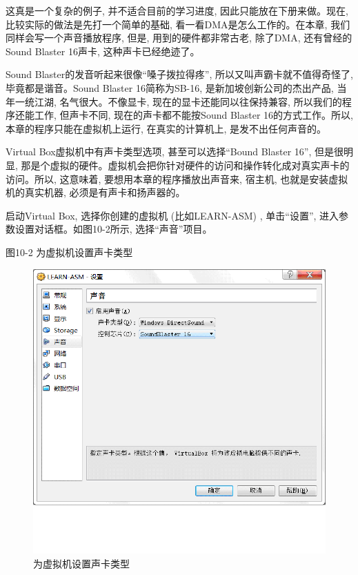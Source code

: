 \documentclass[12pt]{article}
\begin{document}
\begin{CJK}{UTF8}{gbsn}
这真是一个复杂的例子, 并不适合目前的学习进度, 因此只能放在下册来做。现在, 比较实际的做法是先打一个简单的基础, 看一看DMA是怎么工作的。在本章, 我们同样会写一个声音播放程序, 但是, 用到的硬件都非常古老, 除了DMA, 还有曾经的Sound Blaster 16声卡, 这种声卡已经绝迹了。

Sound Blaster的发音听起来很像“嗓子拨拉得疼”, 所以又叫声霸卡就不值得奇怪了, 毕竟都是谐音。Sound Blaster 16简称为SB-16, 是新加坡创新公司的杰出产品, 当年一统江湖, 名气很大。不像显卡, 现在的显卡还能同以往保持兼容, 所以我们的程序还能工作, 但声卡不同, 现在的声卡都不能按Sound Blaster 16的方式工作。所以, 本章的程序只能在虚拟机上运行, 在真实的计算机上, 是发不出任何声音的。

Virtual Box虚拟机中有声卡类型选项, 甚至可以选择“Bound Blaster 16”, 但是很明显, 那是个虚拟的硬件。虚拟机会把你针对硬件的访问和操作转化成对真实声卡的访问。所以, 这意味着, 要想用本章的程序播放出声音来, 宿主机, 也就是安装虚拟机的真实机器, 必须是有声卡和扬声器的。

启动Virtual Box, 选择你创建的虚拟机 (比如LEARN-ASM) , 单击“设置”, 进入参数设置对话框。如图10-2所示, 选择“声音”项目。
 
图10-2  为虚拟机设置声卡类型
\begin{figure}
\begin{center}
\includegraphics[width=\textwidth]{eps/10-2.bmp.eps}
\caption{为虚拟机设置声卡类型}\label{vm}
\end{center}
\end{figure}


\end{CJK}
\end{document}
